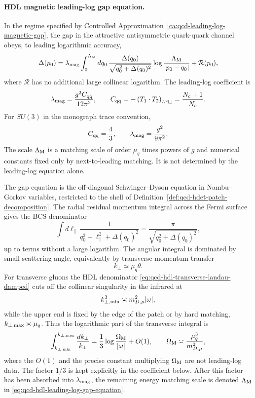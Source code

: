 \paragraph{HDL magnetic leading-log gap equation.}
In the regime specified by
Controlled Approximation~\ref{ca:qcd-leading-log-magnetic-gap}, the gap in the
attractive antisymmetric quark-quark channel obeys, to leading logarithmic
accuracy,
\begin{equation}
  \Delta(p_0)
  =
  \lambda_{\rm mag}
  \int_0^{\Lambda_{\rm M}}
  dq_0\,
  \frac{\Delta(q_0)}{\sqrt{q_0^2+\Delta(q_0)^2}}
  \log\frac{\Lambda_{\rm M}}{|p_0-q_0|}
  +\mathcal R(p_0),
  \label{eq:qcd-hdl-leading-log-gap-equation}
\end{equation}
where \(\mathcal R\) has no additional large collinear logarithm.  The
leading-log coefficient is
\begin{equation}
  \lambda_{\rm mag}
  =
  \frac{g^2 C_{\rm qq}}{12\pi^2},
  \qquad
  C_{\rm qq}
  =
  -\left(T_1\cdot T_2\right)_{\wedge^2\square}
  =
  \frac{N_c+1}{N_c}.
  \label{eq:qcd-magnetic-gap-lambda-general}
\end{equation}
For \(SU(3)\) in the monograph trace convention,
\begin{equation}
  C_{\rm qq}=\frac43,
  \qquad
  \lambda_{\rm mag}=\frac{g^2}{9\pi^2}.
  \label{eq:qcd-magnetic-gap-lambda-su3}
\end{equation}
The scale \(\Lambda_{\rm M}\) is a matching scale of order \(\mu_q\) times
powers of \(g\) and numerical constants fixed only by next-to-leading
matching.  It is not determined by the leading-log equation alone.

The gap equation is the off-diagonal Schwinger--Dyson equation in
Nambu--Gorkov variables, restricted to the shell of
Definition~\ref{def:qcd-hdet-patch-decomposition}.  The radial residual
momentum integral across the Fermi surface gives the BCS denominator
\[
  \int d\ell_\parallel\,
  \frac{1}{q_0^2+\ell_\parallel^2+\Delta(q_0)^2}
  =
  \frac{\pi}{\sqrt{q_0^2+\Delta(q_0)^2}},
\]
up to terms without a large logarithm.  The angular integral is dominated
by small scattering angle, equivalently by transverse momentum transfer
\[
  k_\perp\simeq \mu_q\theta .
\]
For transverse gluons the HDL denominator
\eqref{eq:qcd-hdl-transverse-landau-damped} cuts off the collinear
singularity in the infrared at
\[
  k_{\perp,{\rm min}}^3
  \asymp
  m_{D,\mu}^2|\omega|,
\]
while the upper end is fixed by the edge of the patch or by hard matching,
\(k_{\perp,{\rm max}}\asymp\mu_q\).  Thus the logarithmic part of the
transverse integral is
\[
  \int_{k_{\perp,{\rm min}}}^{k_{\perp,{\rm max}}}
  \frac{dk_\perp}{k_\perp}
  =
  \frac13
  \log\frac{\Omega_{\rm M}}{|\omega|}
  +O(1),
  \qquad
  \Omega_{\rm M}\asymp \frac{\mu_q^3}{m_{D,\mu}^2},
\]
where the \(O(1)\) and the precise constant multiplying
\(\Omega_{\rm M}\) are not leading-log data.  The factor \(1/3\) is kept
explicitly in the coefficient below.  After this factor has been absorbed
into \(\lambda_{\rm mag}\), the remaining energy matching scale is denoted
\(\Lambda_{\rm M}\) in \eqref{eq:qcd-hdl-leading-log-gap-equation}.

